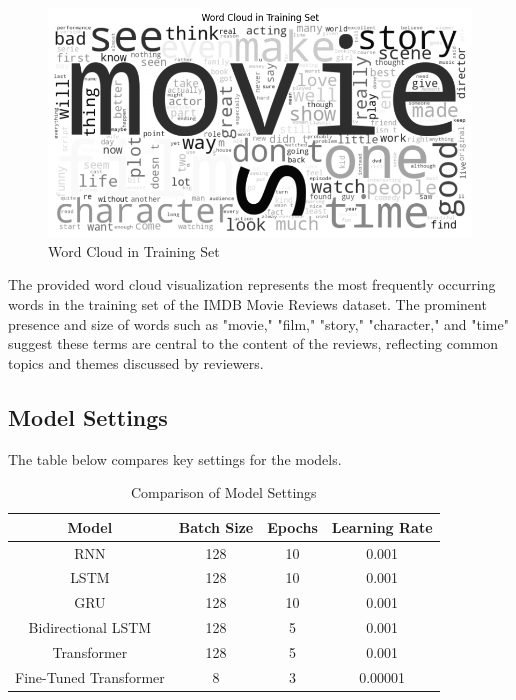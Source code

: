 \documentclass{article}
\begin{document}
\begin{figure}[H]
    \centering
    \includegraphics[width=\textwidth]{figs/wordcloudimdb.png}
    \caption{Word Cloud in Training Set}
    \label{fig:wordcloudimdb}
\end{figure}
The provided word cloud visualization represents the most frequently occurring words in the training set of the IMDB Movie Reviews dataset. The prominent presence and size of words such as "movie," "film," "story," "character," and "time" suggest these terms are central to the content of the reviews, reflecting common topics and themes discussed by reviewers.

\subsection{Model Settings}
The table below compares key settings for the models.

\begin{table}[H]
\centering
\begin{tabular}{|c|c|c|c|}
\hline
\textbf{Model} & \textbf{Batch Size} & \textbf{Epochs} & \textbf{Learning Rate} \\
\hline
RNN & 128 & 10 & 0.001 \\
LSTM & 128 & 10 & 0.001 \\
GRU & 128 & 10 & 0.001 \\
Bidirectional LSTM & 128 & 5 & 0.001 \\
Transformer & 128 & 5 & 0.001 \\
Fine-Tuned Transformer & 8 & 3 & 0.00001 \\
\hline
\end{tabular}
\caption{Comparison of Model Settings}
\label{table:model-settings}
\end{table}
\end{document}
